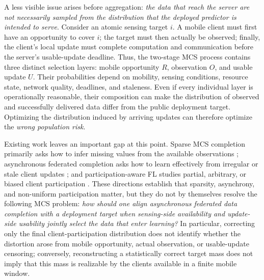 \documentclass[letterpaper,journal]{IEEEtran}
\begin{document}
A less visible issue arises before aggregation: \emph{the data that reach the
server are not necessarily sampled from the distribution that the deployed
predictor is intended to serve}.  Consider an atomic sensing target $i$.  A
mobile client must first have an opportunity to cover $i$; the target must then
actually be observed; finally, the client's local update must complete
computation and communication before the server's usable-update deadline.
Thus, the two-stage MCS process contains three distinct selection layers:
mobile opportunity $R$, observation $O$, and usable update $U$.  Their
probabilities depend on mobility, sensing conditions, resource state, network
quality, deadlines, and staleness.  Even if every individual layer is
operationally reasonable, their composition can make the distribution of
observed and successfully delivered data differ from the public deployment
target.  Optimizing the distribution induced by arriving updates can therefore
optimize the \emph{wrong population risk}.

Existing work leaves an important gap at this point.  Sparse MCS completion
primarily asks how to infer missing values from the available observations
\cite{wang2023spatiotemporal,li2024robust}; asynchronous federated completion
asks how to learn effectively from irregular or stale client updates
\cite{wang2026federated,sun2024staleness}; and participation-aware FL studies
partial, arbitrary, or biased client participation
\cite{wang2022unified,jhunjhunwala2022fedvarp,wu2023anchor,wang2024lightweight,sun2025debiasing,mohri2019agnostic,chen2026fedcure}.
These directions establish that sparsity, asynchrony, and non-uniform
participation matter, but they do not by themselves resolve the following MCS
problem: \emph{how should one align asynchronous federated data completion with
a deployment target when sensing-side availability and update-side usability
jointly select the data that enter learning?}  In particular, correcting only
the final client-participation distribution does not identify whether the
distortion arose from mobile opportunity, actual observation, or usable-update
censoring; conversely, reconstructing a statistically correct target mass does
not imply that this mass is realizable by the clients available in a finite
mobile window.
\end{document}

